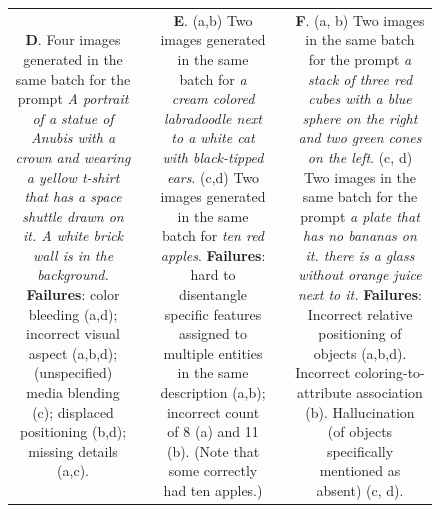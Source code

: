 \begin{figure}
\begin{adjustwidth}{-0.8in}{-0.5in}
\begin{tabular}{cccccccccccccccccccc}
\multicolumn{6}{C{\thirdcolwidth\textwidth}}{\tiny \textbf{D}. Four images generated in the same batch for the prompt  \textit{A portrait of a statue of Anubis with a crown and wearing a yellow t-shirt that has a space shuttle drawn on it. A white brick wall is in the background.} \textbf{Failures}: color bleeding (a,d); incorrect visual aspect (a,b,d); (unspecified) media blending (c); displaced positioning (b,d); missing details (a,c).} && 
\multicolumn{6}{C{\thirdcolwidth\textwidth}}{\tiny \textbf{E}. (a,b) Two images generated in the same batch for  \textit{a cream colored labradoodle next to a white cat with black-tipped ears}. (c,d) Two images generated in the same batch for \textit{ten red apples}. \textbf{Failures}: hard to disentangle specific features assigned to multiple entities in the same description (a,b); incorrect count of 8 (a) and 11 (b). (Note that some correctly had ten apples.)} && 
\multicolumn{6}{C{\thirdcolwidth\textwidth}}{\tiny \textbf{F}. (a, b) Two images in the same batch for the prompt  \textit{a stack of three red cubes with a blue sphere on the right and two green cones on the left}. (c, d) Two images in the same batch for the prompt \textit{a plate that has no bananas on it. there is a glass without orange juice next to it.} \textbf{Failures}: Incorrect relative positioning of objects (a,b,d). Incorrect coloring-to-attribute association (b). Hallucination (of objects specifically mentioned as absent) (c, d).} \\


\end{tabular}
\end{adjustwidth}
\end{figure}
